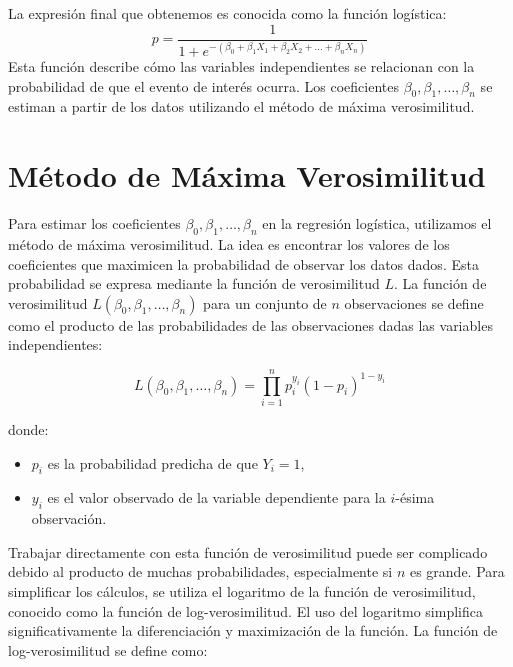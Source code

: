 La expresión final que obtenemos es conocida como la función logística:
\begin{equation}\label{Eq.Logit1}
p = \frac{1}{1 + e^{-\left(\beta_0 + \beta_1 X_1 + \beta_2 X_2 + \ldots + \beta_n X_n\right)}}
\end{equation}
Esta función describe cómo las variables independientes se relacionan con la probabilidad de que el evento de interés ocurra. Los coeficientes $\beta_0, \beta_1, \ldots, \beta_n$ se estiman a partir de los datos utilizando el método de máxima verosimilitud.

\section{Método de Máxima Verosimilitud}

Para estimar los coeficientes $\beta_0, \beta_1, \ldots, \beta_n$ en la regresión logística, utilizamos el método de máxima verosimilitud. La idea es encontrar los valores de los coeficientes que maximicen la probabilidad de observar los datos dados. Esta probabilidad se expresa mediante la función de verosimilitud $L$. La función de verosimilitud $L(\beta_0, \beta_1, \ldots, \beta_n)$ para un conjunto de $n$ observaciones se define como el producto de las probabilidades de las observaciones dadas las variables independientes:

\begin{equation}\label{Eq.Verosimilitud}
L(\beta_0, \beta_1, \ldots, \beta_n) = \prod_{i=1}^{n} p_i^{y_i} (1 - p_i)^{1 - y_i}
\end{equation}

donde:
\begin{itemize}
    \item $p_i$ es la probabilidad predicha de que $Y_i = 1$,
    \item $y_i$ es el valor observado de la variable dependiente para la $i$-ésima observación.
\end{itemize}


Trabajar directamente con esta función de verosimilitud puede ser complicado debido al producto de muchas probabilidades, especialmente si $n$ es grande. Para simplificar los cálculos, se utiliza el logaritmo de la función de verosimilitud, conocido como la función de log-verosimilitud. El uso del logaritmo simplifica significativamente la diferenciación y maximización de la función. La función de log-verosimilitud se define como:

